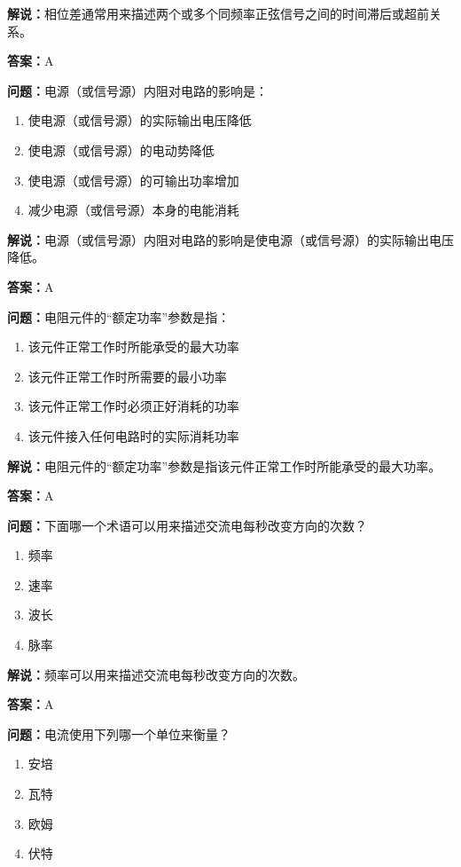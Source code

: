 \documentclass[UTF8]{ctexbook}
\begin{document}
\textbf{解说：}相位差通常用来描述两个或多个同频率正弦信号之间的时间滞后或超前关系。

\textbf{答案：}A

\textbf{问题：}电源（或信号源）内阻对电路的影响是：

\begin{enumerate}[label=\Alph*), leftmargin=3em]
  \item 使电源（或信号源）的实际输出电压降低
  \item 使电源（或信号源）的电动势降低
  \item 使电源（或信号源）的可输出功率增加
  \item 减少电源（或信号源）本身的电能消耗
\end{enumerate}

\textbf{解说：}电源（或信号源）内阻对电路的影响是使电源（或信号源）的实际输出电压降低。

\textbf{答案：}A

\textbf{问题：}电阻元件的“额定功率”参数是指：

\begin{enumerate}[label=\Alph*), leftmargin=3em]
  \item 该元件正常工作时所能承受的最大功率
  \item 该元件正常工作时所需要的最小功率
  \item 该元件正常工作时必须正好消耗的功率
  \item 该元件接入任何电路时的实际消耗功率
\end{enumerate}

\textbf{解说：}电阻元件的“额定功率”参数是指该元件正常工作时所能承受的最大功率。

\textbf{答案：}A

\textbf{问题：}下面哪一个术语可以用来描述交流电每秒改变方向的次数？

\begin{enumerate}[label=\Alph*), leftmargin=3em]
  \item 频率
  \item 速率
  \item 波长
  \item 脉率
\end{enumerate}

\textbf{解说：}频率可以用来描述交流电每秒改变方向的次数。

\textbf{答案：}A

\textbf{问题：}电流使用下列哪一个单位来衡量？

\begin{enumerate}[label=\Alph*), leftmargin=3em]
  \item 安培
  \item 瓦特
  \item 欧姆
  \item 伏特
\end{enumerate}
\end{document}

